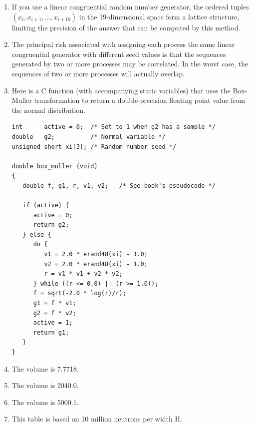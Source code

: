 \begin{enumerate}
\item If you use a linear congruential random number generator,
      the ordered tuples $(x_i, x_{i+1}, \ldots, x_{i+19})$ in the
      19-dimensional space form a lattice structure, limiting the precision
      of the answer that can be computed by this method.

\item The principal risk associated with assigning each process the same
      linear congruential generator with different seed values is that the
      sequences generated by two or more processes may be correlated. In
      the worst case, the sequences of two or more processes will actually
      overlap.

\item Here is a C function (with accompanying static variables) that
      uses the Box-Muller transformation to return a double-precision
      floating point value from the normal distribution.

\begin{verbatim}
int      active = 0;  /* Set to 1 when g2 has a sample */
double   g2;          /* Normal variable */
unsigned short xi[3]; /* Random number seed */

double box_muller (void)
{
   double f, g1, r, v1, v2;   /* See book's pseudocode */

   if (active) {
      active = 0;
      return g2;
   } else {
      do {
         v1 = 2.0 * erand48(xi) - 1.0;
         v2 = 2.0 * erand48(xi) - 1.0;
         r = v1 * v1 + v2 * v2;
      } while ((r <= 0.0) || (r >= 1.0));
      f = sqrt(-2.0 * log(r)/r);
      g1 = f * v1;
      g2 = f * v2;
      active = 1;
      return g1;
   }
}
\end{verbatim}

\item The volume is 7.7718.

\item The volume is 2040.0.

\item The volume is 5000.1.

\addtocounter{enumi}{1}

\item This table is based on 10 million neutrons per width H.


\end{enumerate}
